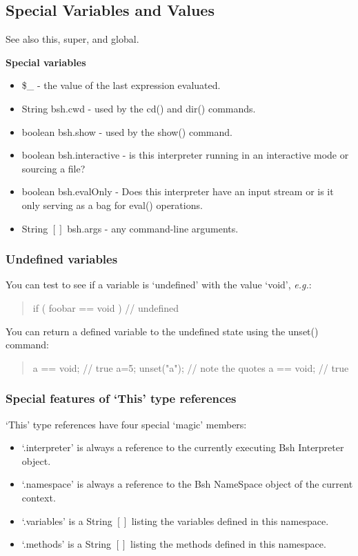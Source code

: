 \documentclass[twoside,11pt,nolof]{starlink}
\providecommand{\eg}{\textit{e.g.}}
\begin{document}
\subsection{Special Variables and Values}

See also this, super, and global.

\textbf{Special variables}
\begin{itemize}
 \item \$\_  - the value of the last expression evaluated.
 \item String bsh.cwd - used by the cd() and dir() commands.
 \item boolean bsh.show - used by the show() command.
 \item boolean bsh.interactive - is this interpreter running in an
 interactive mode or sourcing a file?
 \item boolean bsh.evalOnly - Does this interpreter have an input
 stream or is it only serving as a bag  for eval() operations.
 \item String $[]$ bsh.args - any command-line arguments.
\end{itemize}

\subsubsection{Undefined variables}
You can test to see if a variable is `undefined' with the value `void', \eg:
\begin{quote}
\begin{terminalv}
    if ( foobar == void )
        // undefined
\end{terminalv}
\end{quote}
You can return a defined variable to the undefined state using the unset()
command:
\begin{quote}
\begin{terminalv}
    a == void;  // true
    a=5;
    unset("a"); // note the quotes
    a == void;  // true
\end{terminalv}
\end{quote}

\subsubsection{Special features of `This' type references}
`This' type references have four special `magic' members:
\begin{itemize}
\item `.interpreter' is always a reference to the currently executing Bsh
      Interpreter object.
\item `.namespace' is always a reference to the Bsh NameSpace object  of the
      current context.
\item `.variables' is a String $[]$ listing the variables defined in this
      namespace.
\item `.methods' is a String $[]$ listing the methods defined in this
      namespace.
\end{itemize}
\end{document}
